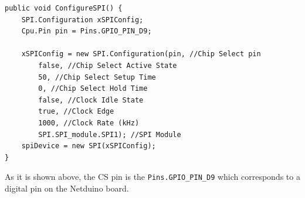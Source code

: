 \begin{lstlisting}[language=CSharp, caption={SPIApi.cs - Configuring SPI for the MFRC522 in Netduino Plus}]
public void ConfigureSPI() {
    SPI.Configuration xSPIConfig;
    Cpu.Pin pin = Pins.GPIO_PIN_D9;

    xSPIConfig = new SPI.Configuration(pin, //Chip Select pin
        false, //Chip Select Active State
        50, //Chip Select Setup Time
        0, //Chip Select Hold Time
        false, //Clock Idle State
        true, //Clock Edge
        1000, //Clock Rate (kHz)
        SPI.SPI_module.SPI1); //SPI Module
    spiDevice = new SPI(xSPIConfig);
}
\end{lstlisting}
As it is shown above, the \gls{CS} pin is the \verb!Pins.GPIO_PIN_D9! which corresponds to a digital pin on the Netduino board.

